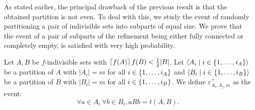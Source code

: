         As stated earlier, the principal drawback of the previous result is that the obtained partition is not even.
        To deal with this, we study the event of randomly partitioning a pair of indivisible sets
        into subparts of equal size.
        We prove that the event of a pair of subparts of the refinement being either fully connected or completely empty,
        is satisfied with very high probability.

        \begin{definition}
            Let $A, B$ be $f$-indivisible sets with $\left\lceil f(A) \right\rceil f(B) < \frac{1}{2} |B|$.
            Let $\left< A_i \mid i \in \{ 1, \dots, i_A \} \right>$ be a partition of $A$ with $|A_i| = m$ for all
            $i \in \{ 1, \dots, i_A \}$ and $\left< B_i \mid i \in \{ 1, \dots, i_B \} \right>$ be a partition of
            $B$ with $|B_i| = m$ for all $i \in \{ 1, \dots, i_B \}$.
            We define $\varepsilon^+_{A_i,A_j,m}$ as the event:
            \[
                \forall a \in A_i \ \forall b \in B_i, a R b = t(A,B).
            \]
        \end{definition}


